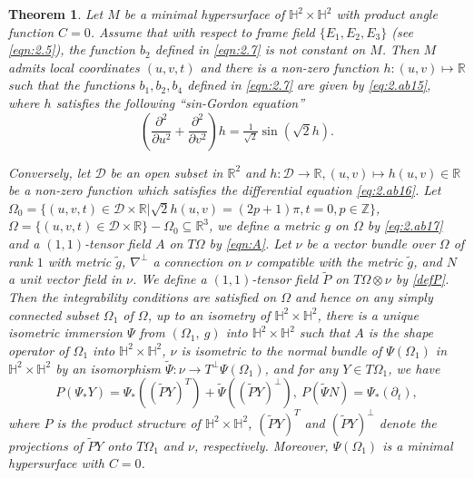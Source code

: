 \documentclass[reqno]{amsart}%
\newtheorem{theorem}{Theorem}[section]   %
\theoremstyle{definition}
\numberwithin{equation}{section}
\begin{document}
\begin{theorem}\label{thm:3.1}
Let $M$ be a minimal hypersurface of $\mathbb{H}^2\times \mathbb{H}^2$ with product angle function $C=0$.
Assume that with respect to frame field $\{E_1,E_2,E_3\}$ (see \eqref{eqn:2.5}), the function $b_2$ defined in \eqref{eqn:2.7} is not constant on $M$.
Then $M$ admits local coordinates $(u,v,t)$ and there is a non-zero function $h:(u,v)\mapsto \mathbb{R}$
such that the functions $b_1,b_2,b_4$ defined in \eqref{eqn:2.7} are given by
\eqref{eq:2.ab15}, where $h$ satisfies the following ``sin-Gordon equation''
%
\begin{equation}\label{eq:2.ab16}
(\frac{\partial^2}{\partial u^2}+\frac{\partial^2}{\partial v^2})h
=\tfrac{1}{\sqrt{2}}\sin(\sqrt{2}h).
\end{equation}

Conversely, let $\mathcal{D}$ be an open subset in $\mathbb{R}^2$ and  $h:\mathcal{D}\to\mathbb{R}, (u,v)\mapsto h(u,v)\in\mathbb{R}$
be a non-zero function which satisfies the differential equation \eqref{eq:2.ab16}.
Let $\Omega_0=\{(u,v,t)\in \mathcal{D}\times \mathbb{R}|\sqrt{2}h(u,v)=(2p+1)\pi,t=0, p\in\mathbb{Z}\}$, $\Omega=\{(u,v,t)\in \mathcal{D}\times \mathbb{R}\}-\Omega_0\subseteq \mathbb{R}^3$, we define a metric $g$ on $\Omega$ by \eqref{eq:2.ab17} and a $(1,1)$-tensor field $A$ on $T\Omega$ by
\eqref{eqn:A}. Let $\nu$ be a vector bundle over  $\Omega$ of rank $1$ with metric $\tilde{g}$, $\nabla^{\perp}$ a connection on $\nu$ compatible with the metric $\tilde{g}$, and $N$ a unit vector field in $\nu$.   We define a $(1,1)$-tensor field $\tilde{P}$ on $T\Omega\otimes \nu$ by
\eqref{defP}.
Then the integrability conditions are satisfied on $\Omega$ and hence on any simply
connected subset $\Omega_1$ of $\Omega$, up to an isometry of  $\mathbb{H}^2\times \mathbb{H}^2$, there is a unique isometric immersion $\Psi$ from $(\Omega_1,~g)$ into $\mathbb{H}^2\times \mathbb{H}^2$ such that $A$ is the shape operator of  $\Omega_1$ into $\mathbb{H}^2\times \mathbb{H}^2$, $\nu$ is isometric to the normal bundle of $\Psi(\Omega_1)$ in
$\mathbb{H}^2\times \mathbb{H}^2$ by an isomorphism $\tilde{\Psi}:\nu\to T^{\perp}\Psi(\Omega_1)$,
and for any $Y\in T\Omega_1$, we have
\begin{equation}
	P(\Psi_{*}Y)=\Psi_{*}((\tilde{P}Y)^{T})+\tilde{\Psi}((\tilde{P}Y)^{\perp}),~
	P(\tilde{\Psi}N)=\Psi_*(\partial_t),
\end{equation}
where $P$ is the product structure of $\mathbb{H}^2\times \mathbb{H}^2$, $(\tilde{P}Y)^{T}$ and $(\tilde{P}Y)^{\perp}$ denote the projections of  $\tilde{P}Y$ onto $T\Omega_1$ and $\nu$, respectively.
Moreover, $\Psi(\Omega_1)$ is a minimal hypersurface with $C=0$.
\end{theorem}
\end{document}
